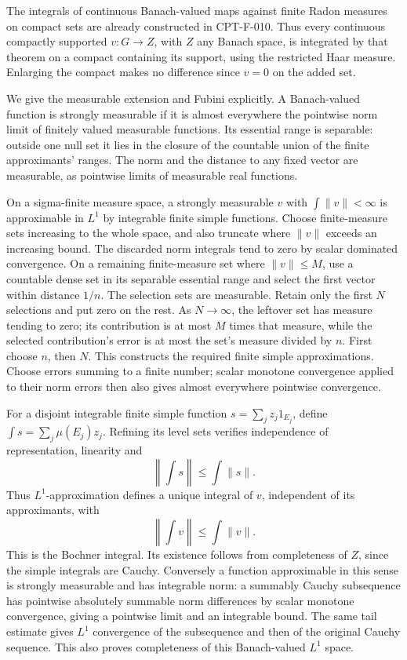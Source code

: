 \documentclass[
  11pt,
]{article}
\begin{document}
The integrals of continuous Banach-valued maps against finite Radon
measures on compact sets are already constructed in CPT-F-010. Thus
every continuous compactly supported \(v:G\to Z\), with \(Z\) any Banach
space, is integrated by that theorem on a compact containing its
support, using the restricted Haar measure. Enlarging the compact makes
no difference since \(v=0\) on the added set.

We give the measurable extension and Fubini explicitly. A Banach-valued
function is strongly measurable if it is almost everywhere the pointwise
norm limit of finitely valued measurable functions. Its essential range
is separable: outside one null set it lies in the closure of the
countable union of the finite approximants' ranges. The norm and the
distance to any fixed vector are measurable, as pointwise limits of
measurable real functions.

On a sigma-finite measure space, a strongly measurable \(v\) with
\(\int\|v\|<\infty\) is approximable in \(L^1\) by integrable finite
simple functions. Choose finite-measure sets increasing to the whole
space, and also truncate where \(\|v\|\) exceeds an increasing bound.
The discarded norm integrals tend to zero by scalar dominated
convergence. On a remaining finite-measure set where \(\|v\|\leq M\),
use a countable dense set in its separable essential range and select
the first vector within distance \(1/n\). The selection sets are
measurable. Retain only the first \(N\) selections and put zero on the
rest. As \(N\to\infty\), the leftover set has measure tending to zero;
its contribution is at most \(M\) times that measure, while the selected
contribution's error is at most the set's measure divided by \(n\).
First choose \(n\), then \(N\). This constructs the required finite
simple approximations. Choose errors summing to a finite number; scalar
monotone convergence applied to their norm errors then also gives almost
everywhere pointwise convergence.

For a disjoint integrable finite simple function
\(s=\sum_j z_j1_{E_j}\), define \(\int s=\sum_j\mu(E_j)z_j\). Refining
its level sets verifies independence of representation, linearity and \[
 \left\|\int s\right\|\leq\int\|s\|.
\] Thus \(L^1\)-approximation defines a unique integral of \(v\),
independent of its approximants, with \[
 \left\|\int v\right\|\leq\int\|v\|.                    \tag{NC.14}
\] This is the Bochner integral. Its existence follows from completeness
of \(Z\), since the simple integrals are Cauchy. Conversely a function
approximable in this sense is strongly measurable and has integrable
norm: a summably Cauchy subsequence has pointwise absolutely summable
norm differences by scalar monotone convergence, giving a pointwise
limit and an integrable bound. The same tail estimate gives \(L^1\)
convergence of the subsequence and then of the original Cauchy sequence.
This also proves completeness of this Banach-valued \(L^1\) space.
\end{document}
